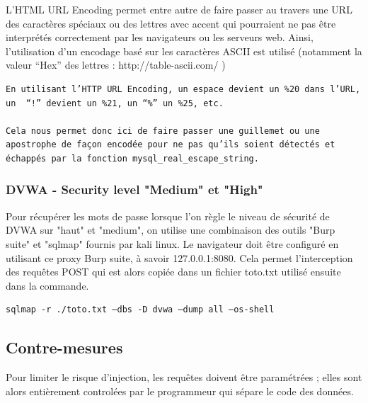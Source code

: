 L’HTML URL Encoding permet entre autre de faire passer au travers une URL des caractères spéciaux ou des lettres avec accent qui pourraient ne pas être interprétés correctement par les navigateurs ou les serveurs web. Ainsi, l’utilisation d’un encodage basé sur les caractères ASCII est utilisé (notamment la valeur “Hex” des lettres : http://table-ascii.com/ )

\begin{verbatim}
En utilisant l’HTTP URL Encoding, un espace devient un %20 dans l’URL, un  “!” devient un %21, un “%” un %25, etc.

Cela nous permet donc ici de faire passer une guillemet ou une apostrophe de façon encodée pour ne pas qu’ils soient détectés et échappés par la fonction mysql_real_escape_string.
\end{verbatim}


\subsubsection{DVWA - Security level "Medium" et "High"}

Pour récupérer les mots de passe lorsque l'on règle le niveau de sécurité de DVWA sur "haut" et "medium", on utilise une combinaison des outils "Burp suite" et "sqlmap" fournis par kali linux. Le navigateur doit être configuré en utilisant ce proxy Burp suite, à savoir 127.0.0.1:8080. Cela permet l'interception des requêtes POST qui est alors copiée dans un fichier toto.txt utilisé ensuite dans la commande.

\begin{verbatim}
sqlmap -r ./toto.txt –dbs -D dvwa –dump all –os-shell
\end{verbatim}


\subsection{Contre-mesures}

Pour limiter le risque d'injection, les requêtes doivent être paramétrées ; elles sont alors entièrement controlées par le programmeur qui sépare le code des données. 

